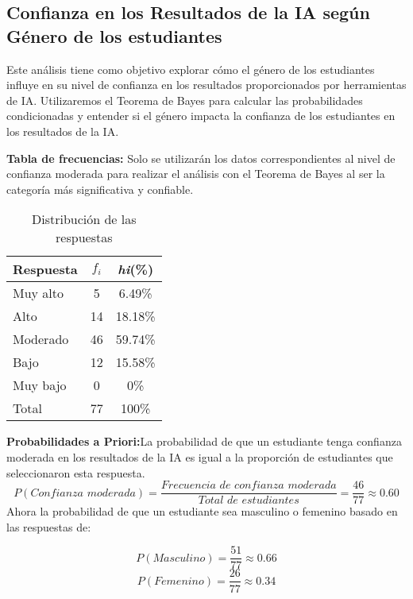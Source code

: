 \subsection{Confianza en los Resultados de la IA según Género de los estudiantes}
Este análisis tiene como objetivo explorar cómo el género de los estudiantes influye en su nivel de confianza en los resultados proporcionados por herramientas de IA. Utilizaremos el Teorema de Bayes para calcular las probabilidades condicionadas y entender si el género impacta la confianza de los estudiantes en los resultados de la IA.

\textbf{Tabla de frecuencias:}
Solo se utilizarán los datos correspondientes al nivel de confianza moderada para realizar el análisis con el Teorema de Bayes al ser la categoría más significativa y confiable.
\begin{table}[H]
	\centering
	\renewcommand{\arraystretch}{1.2}
	\begin{tabular}{l c c}
		\hline
		{Respuesta} & {\(f_i\)} & \textit{hi}(\%)\\
		\hline
		Muy alto    & 5  & 6.49\%\\
		Alto        & 14 & 18.18\%\\
		Moderado    & 46 & 59.74\%\\
		Bajo        & 12 & 15.58\%\\
		Muy bajo    & 0  & 0\%\\
		\hline
		Total       & 77 & 100\%\\
		\hline
	\end{tabular}
	\caption{Distribución de las respuestas}
	\label{tabla:confianzaEnResultados}
\end{table}

\textbf{Probabilidades a Priori:}La probabilidad de que un estudiante tenga confianza moderada en los resultados de la IA es igual a la proporción de estudiantes que seleccionaron esta respuesta.
\begin{equation*}
	P(\textit{Confianza moderada}) = \dfrac{\textit{Frecuencia de confianza moderada}}{\textit{Total de estudiantes}} = \dfrac{46}{77} \approx 0.60
\end{equation*}
Ahora la probabilidad de que un estudiante sea masculino o femenino basado en las respuestas de:
\begin{multicols}{2}
	\begin{equation*}
		P(\textit{Masculino}) = \dfrac{51}{77} \approx 0.66
	\end{equation*}
	\begin{equation*}
		P(\textit{Femenino}) = \dfrac{26}{77} \approx 0.34
	\end{equation*}
\end{multicols}
\vspace{-0.5cm}

